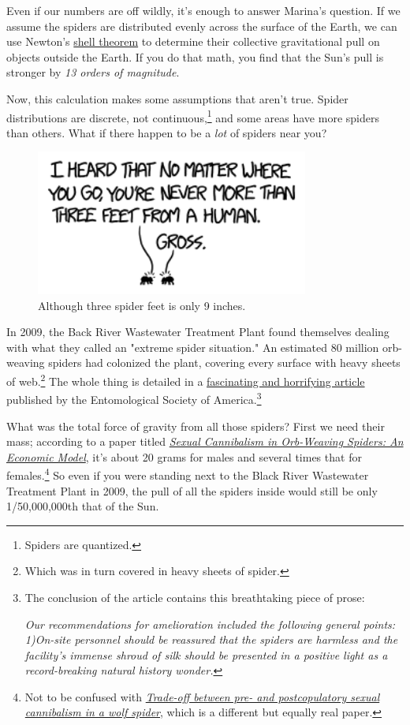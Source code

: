 {{Even if our numbers are off wildly, it's enough to answer Marina's question. If we assume the spiders are distributed evenly across the surface of the Earth, we can use Newton's \href{https://en.wikipedia.org/wiki/Shell\_theorem}{shell theorem} to determine their collective gravitational pull on objects outside the Earth. If you do that math, you find that the Sun's pull is stronger by \emph{13 orders of magnitude}.}

{Now, this calculation makes some assumptions that aren't true. Spider distributions are discrete, not continuous,{\footnote{Spiders are quantized.} } and some areas have more spiders than others. What if there happen to be a \emph{lot} of spiders near you?}

\begin{figure}[!htbp]
\centering
\includegraphics[scale=0.5, max width=0.8\textwidth]{imgs/a/136/feet.png}
\caption{Although three spider feet is only 9 inches.}
\end{figure}

{In 2009, the Back River Wastewater Treatment Plant found themselves dealing with what they called an "extreme spider situation." An estimated 80 million orb-weaving spiders had colonized the plant, covering every surface with heavy sheets of web.{\footnote{Which was in turn covered in heavy sheets of spider.} } The whole thing is detailed in a \href{http://www.entsoc.org/PDF/2010/Orb-weaving-spiders.pdf}{fascinating and horrifying article} published by the Entomological Society of America.{\footnote{The conclusion of the article contains this breathtaking piece of prose:

\emph{Our recommendations for amelioration included the following general points:
1)On-site personnel should be reassured that the spiders are harmless and the facility's immense shroud of silk should be presented in a positive light as a record-breaking natural history wonder.} } } }

{What was the total force of gravity from all those spiders? First we need their mass; according to a paper titled \emph{ \href{http://www.jstor.org/discover/10.2307/2462552?uid=3739808&uid=2&uid=4&uid=3739256&sid=21105973527841}{Sexual Cannibalism in Orb-Weaving Spiders: An Economic Model}}, it's about 20 grams for males and several times that for females.{\footnote{Not to be confused with \emph{ \href{http://link.springer.com/article/10.1007\%2Fs00265-011-1269-0} {Trade-off between pre- and postcopulatory sexual cannibalism in a wolf spider}}, which is a different but equally real paper.} } So even if you were standing next to the Black River Wastewater Treatment Plant in 2009, the pull of all the spiders inside would still be only 1/50,000,000th that of the Sun.}

}
